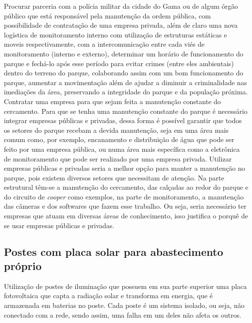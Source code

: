 Procurar parceria com a pol\'icia militar da cidade do Gama ou de algum \'org\~ao p\'ublico que est\'a respons\'avel pela manuten\c{c}\~ao da ordem p\'ublica, com possibilidade de contrata\c{c}\~ao de uma empresa privada, al\'em de claro uma nova log\'istica de monitoramento interno com utiliza\c{c}\~ao de estruturas est\'aticas e moveis respectivamente, com a intercomunica\c{c}\~ao entre cada vi\'es de monitoramento (interno e externo), determinar um hor\'ario de funcionamento do parque e fech\'a-lo ap\'os esse per\'iodo para evitar crimes (entre eles ambientais) dentro do terreno do parque, colaborando assim com um bom funcionamento do parque, aumentar a movimenta\c{c}\~ao al\'em de ajudar a diminuir a criminalidade nas imedia\c{c}\~oes da \'area, preservando a integridade do parque e da popula\c{c}\~ao pr\'oxima. Contratar uma empresa para que sejam feita a manuten\c{c}\~ao constante do cercamento. Para que se tenha uma manuten\c{c}\~ao constante do parque \'e necess\'ario integrar empresas p\'ublicas e privadas, dessa forma \'e poss\'ivel garantir que todos os setores do parque recebam a devida manuten\c{c}\~ao, seja em uma \'area mais comum como, por exemplo, encanamento e distribui\c{c}\~ao de \'agua que pode ser feito por uma empresa p\'ublica, ou numa \'area mais espec\'ifica como a eletr\^onica de monitoramento que pode ser realizado por uma empresa privada. Utilizar empresas p\'ublicas e privadas seria a melhor op\c{c}\~ao para manter a manuten\c{c}\~ao no parque, pois existem diversos setores que necessitam de aten\c{c}\~ao. Na parte estrutural t\^em-se a manuten\c{c}\~ao do cercamento, das cal\c{c}adas ao redor do parque e do circuito de \textit{cooper} como exemplos, na parte de monitoramento, a manuten\c{c}\~ao das c\^ameras e dos softwares que fazem esse trabalho. Ou seja, seria necess\'ario ter empresas que atuam em diversas \'areas de conhecimento, isso justifica o porqu\^e de se usar empresas p\'ublicas e privadas.

\subsection{Postes com placa solar para abastecimento pr\'oprio}

Utiliza\c{c}\~ao de postes de ilumina\c{c}\~ao que possuem em sua parte superior uma placa fotovoltaica que capta a radia\c{c}\~ao solar e transforma em energia, que \'e armazenada em baterias no poste. Cada poste \'e um sistema isolado, ou seja, n\~ao conectado com a rede, sendo assim, uma falha em um deles n\~ao afeta os outros.

